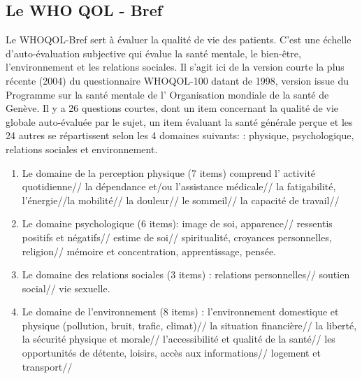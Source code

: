  \subsection{Le WHO QOL - Bref}
 
Le  WHOQOL-Bref sert à évaluer la qualité de vie des patients. C'est une échelle
d'auto-évaluation subjective qui évalue la santé mentale, le
bien-être, l'environnement et les relations sociales.
Il s'agit ici de la version courte  la plus récente (2004) du questionnaire
 WHOQOL-100 datant de 1998, version issue du Programme sur la santé
 mentale de l'
Organisation mondiale de la santé de Genève. Il y a 26 questions
courtes, dont un item concernant la qualité de vie globale
auto-évaluée par le sujet, un item évaluant la santé générale perçue
et les 24 autres se répartissent selon les 4 domaines suivants:  
: physique, psychologique, relations sociales et environnement.
\begin{enumerate}
	\item  Le domaine de la perception physique (7 items) comprend l' activité quotidienne// la dépendance et/ou l'assistance médicale// la fatigabilité, l'énergie//la mobilité// la douleur// le sommeil// la capacité de travail//
	
		 \item Le domaine psychologique (6 items):  image de soi, apparence// ressentis positifs et négatifs// estime de soi// spiritualité, croyances personnelles, religion// mémoire et concentration, apprentissage, pensée.
		
			\item Le domaine des relations sociales (3 items) : relations personnelles// soutien social// vie sexuelle.
			
			\item Le domaine de l'environnement (8 items) :
                          l'environnement domestique et physique
                          (pollution, bruit, trafic, climat)// la
                          situation financière//  la liberté, la
                          sécurité physique et morale//
                          l'accessibilité et qualité de la santé// les
                          opportunités de détente, loisirs, accès aux
                          informations// logement et transport// 
		\end{enumerate}
		
	

